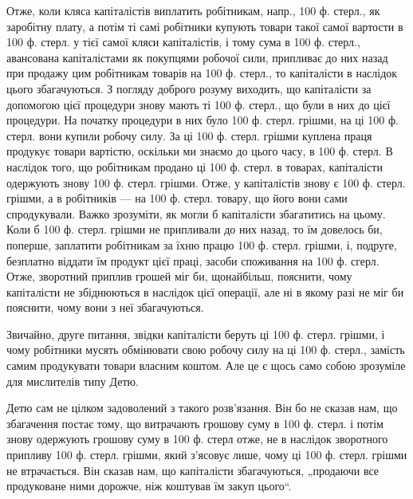 Отже, коли кляса капіталістів виплатить робітникам, напр., 100 ф. стерл.,
як заробітну плату, а потім ті самі робітники купують товари такої самої
вартости в 100 ф. стерл. у тієї самої кляси капіталістів, і тому сума
в 100 ф. стерл., авансована капіталістами як покупцями робочої сили,
припливає до них назад при продажу цим робітникам товарів на 100 ф.
стерл., то капіталісти в наслідок цього збагачуються. З погляду
доброго розуму виходить, що капіталісти за допомогою цієї процедури
знову мають ті 100 ф. стерл., що були в них до цієї процедури. На
початку процедури в них було 100 ф. стерл. грішми, на ці 100 ф. стерл.
вони купили робочу силу. За ці 100 ф. стерл. грішми куплена праця
продукує товари вартістю, оскільки ми знаємо до цього часу, в 100 ф.
стерл. В наслідок того, що робітникам продано ці 100 ф. стерл. в товарах,
капіталісти одержують знову 100 ф. стерл. грішми. Отже, у капіталістів
знову є 100 ф. стерл. грішми, а в робітників — на 100 ф. стерл.
товару, що його вони сами спродукували. Важко зрозуміти, як могли б
капіталісти збагатитись на цьому. Коли б 100 ф. стерл. грішми не припливали
до них назад, то їм довелось би, поперше, заплатити робітникам
за їхню працю 100 ф. стерл. грішми, і, подруге, безплатно віддати
їм продукт цієї праці, засоби споживання на 100 ф. сгерл. Отже, зворотний
приплив грошей міг би, щонайбільш, пояснити, чому капіталісти
не збіднюються в наслідок цієї операції, але ні в якому разі не міг би
пояснити, чому вони з неї збагачуються.

Звичайно, друге питання, звідки капіталісти беруть ці 100 ф. стерл.
грішми, і чому робітники мусять обмінювати свою робочу силу на ці 100 ф.
стерл., замість самим продукувати товари власним коштом. Але це є щось
само собою зрозуміле для мислителів типу Детю.

Детю сам не цілком задоволений з такого розв’язання. Він бо не
сказав нам, що збагачення постає тому, що витрачають грошову суму
в 100 ф. стерл. і потім знову одержують грошову суму в 100 ф. стерл
отже, не в наслідок зворотного припливу 100 ф. стерл. грішми, який
з’ясовує лише, чому ці 100 ф. стерл. грішми не втрачається. Він сказав
нам, що капіталісти збагачуються, „продаючи все продуковане ними
дорожче, ніж коштував їм закуп цього“.

